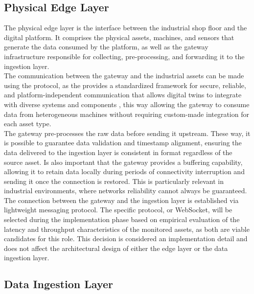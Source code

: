 \subsection{Physical Edge Layer}
The physical edge layer is the interface between the industrial shop floor and the digital platform. It comprises the physical assets, machines, and sensors that generate the data consumed by the platform, as well as the gateway infrastructure responsible for collecting, pre-processing, and forwarding it to the ingestion layer.\\
The communication between the gateway and the industrial assets can be made using the \OPCUA protocol, as the \OPCUA provides a standardized framework for secure, reliable, and platform-independent communication that allows digital twins to integrate with diverse systems and components \cite{David2024}, this way allowing the gateway to consume data from heterogeneous machines without requiring custom-made integration for each asset type.\\
The gateway pre-processes the raw data before sending it upstream. These way, it is possible to guarantee data validation and timestamp alignment, ensuring the data delivered to the ingestion layer is consistent in format regardless of the source asset. Is also important that the gateway provides a buffering capability, allowing it to retain data locally during periods of connectivity interruption and sending it once the connection is restored. This is particularly relevant in industrial environments, where networks reliability cannot always be guaranteed.\\
The connection between the gateway and the ingestion layer is established via lightweight messaging protocol. The specific protocol, \MQTT or WebSocket, will be selected during the implementation phase based on empirical evaluation of the latency and throughput characteristics of the monitored assets, as both are viable candidates for this role. This decision is considered an implementation detail and does not affect the architectural design of either the edge layer or the data ingestion layer.

\subsection{Data Ingestion Layer}

